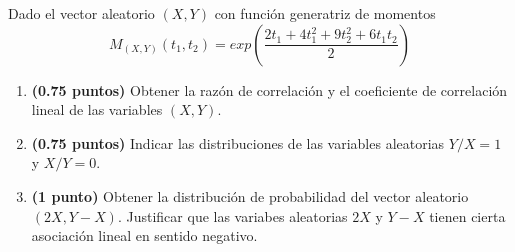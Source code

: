 \documentclass[12pt]{article}
\begin{document}
    \begin{ejercicio}[2.5 puntos]
        Dado el vector aleatorio $(X,Y)$ con función generatriz de momentos
        \begin{equation*}
            M_{(X,Y)}(t_1,t_2) = exp\left(\dfrac{2t_1 + 4t_1^2 + 9t_2^2 + 6t_1t_2}{2}\right)
        \end{equation*}
        \begin{enumerate}
            \item \textbf{(0.75 puntos)} Obtener la razón de correlación y el coeficiente de correlación lineal de las variables $(X,Y)$.
            \item \textbf{(0.75 puntos)} Indicar las distribuciones de las variables aleatorias $Y/X = 1$ y $X/Y=0$.
            \item \textbf{(1 punto)} Obtener la distribución de probabilidad del vector aleatorio $(2X, Y-X)$. Justificar que las variabes aleatorias $2X$ y $Y-X$ tienen cierta asociación lineal en sentido negativo.
        \end{enumerate}
    \end{ejercicio}
\end{document}
